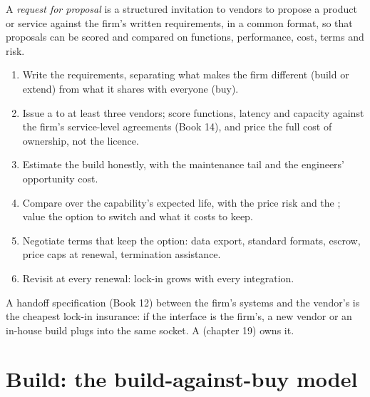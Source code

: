\begin{definition}\label{def:fm:build-against-buy:rfp}
A \emph{request for proposal} is a structured invitation to vendors to propose a product or service against the firm's
written requirements, in a common format, so that proposals can be scored and compared on functions, performance, cost, terms and risk.
\end{definition}

\begin{method}\label{met:fm:build-against-buy:run}
\begin{enumerate}
\item Write the requirements, separating what makes the firm different (build or extend) from what it shares with everyone (buy).
\item Issue a  to at least three vendors; score functions, latency and capacity against the firm's service-level agreements
(Book 14), and price the full cost of ownership, not the licence.
\item Estimate the build honestly, with the maintenance tail and the engineers' opportunity cost.
\item Compare over the capability's expected life, with the price risk and the ; value the option to switch and what it costs to keep.
\item Negotiate terms that keep the option: data export, standard formats, escrow, price caps at renewal, termination assistance.
\item Revisit at every renewal: lock-in grows with every integration.
\end{enumerate}
\end{method}

A handoff specification (Book 12) between the firm's systems and the vendor's is the cheapest lock-in insurance: if the interface is the firm's, a
new vendor or an in-house build plugs into the same socket. A  (chapter 19) owns it.

\section{Build: the build-against-buy model}\label{bld:fm:build-against-buy:buildbuy}

